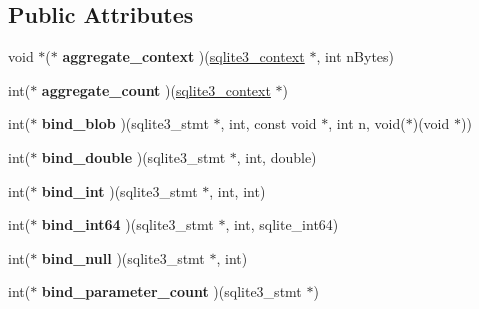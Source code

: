 \subsection*{Public Attributes}
\begin{DoxyCompactItemize}
\item 
void $\ast$($\ast$ {\bfseries aggregate\+\_\+context} )(\hyperlink{structsqlite3__context}{sqlite3\+\_\+context} $\ast$, int n\+Bytes)\hypertarget{structsqlite3__api__routines_a16fafb5f2460657f528338aee5f65d25}{}\label{structsqlite3__api__routines_a16fafb5f2460657f528338aee5f65d25}

\item 
int($\ast$ {\bfseries aggregate\+\_\+count} )(\hyperlink{structsqlite3__context}{sqlite3\+\_\+context} $\ast$)\hypertarget{structsqlite3__api__routines_a8373f7a5dd2d6f1c86bbf024b1796156}{}\label{structsqlite3__api__routines_a8373f7a5dd2d6f1c86bbf024b1796156}

\item 
int($\ast$ {\bfseries bind\+\_\+blob} )(sqlite3\+\_\+stmt $\ast$, int, const void $\ast$, int n, void($\ast$)(void $\ast$))\hypertarget{structsqlite3__api__routines_afeb41d70ab5a221fec488560934c825b}{}\label{structsqlite3__api__routines_afeb41d70ab5a221fec488560934c825b}

\item 
int($\ast$ {\bfseries bind\+\_\+double} )(sqlite3\+\_\+stmt $\ast$, int, double)\hypertarget{structsqlite3__api__routines_aca43a229ce28397ba8c18a4d6e03e40c}{}\label{structsqlite3__api__routines_aca43a229ce28397ba8c18a4d6e03e40c}

\item 
int($\ast$ {\bfseries bind\+\_\+int} )(sqlite3\+\_\+stmt $\ast$, int, int)\hypertarget{structsqlite3__api__routines_a6fef49e6c9c1fa573c55cc6668a8448f}{}\label{structsqlite3__api__routines_a6fef49e6c9c1fa573c55cc6668a8448f}

\item 
int($\ast$ {\bfseries bind\+\_\+int64} )(sqlite3\+\_\+stmt $\ast$, int, sqlite\+\_\+int64)\hypertarget{structsqlite3__api__routines_a489304cada65abca390da9b751da8800}{}\label{structsqlite3__api__routines_a489304cada65abca390da9b751da8800}

\item 
int($\ast$ {\bfseries bind\+\_\+null} )(sqlite3\+\_\+stmt $\ast$, int)\hypertarget{structsqlite3__api__routines_a74d16d0bb57db37d654e95fb7e72c93c}{}\label{structsqlite3__api__routines_a74d16d0bb57db37d654e95fb7e72c93c}

\item 
int($\ast$ {\bfseries bind\+\_\+parameter\+\_\+count} )(sqlite3\+\_\+stmt $\ast$)\hypertarget{structsqlite3__api__routines_ab27285b7fb132f697d5ef22f21469dd6}{}\label{structsqlite3__api__routines_ab27285b7fb132f697d5ef22f21469dd6}


\end{DoxyCompactItemize}

